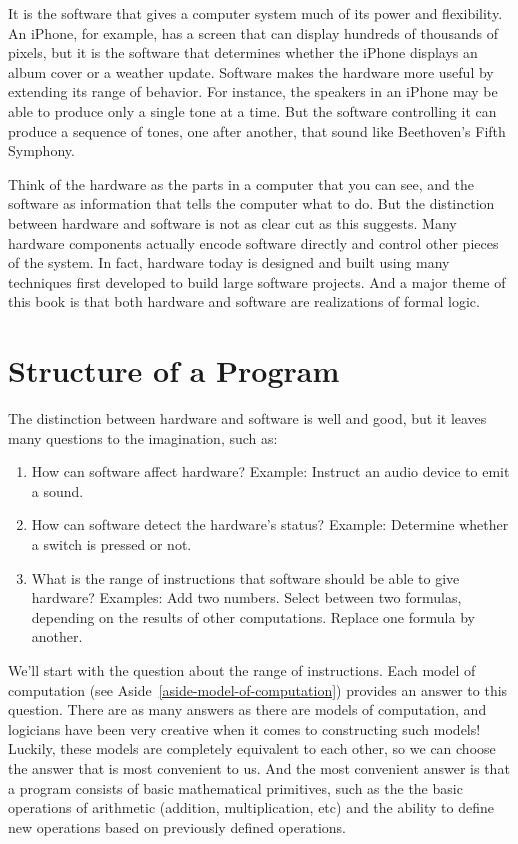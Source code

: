 It is the software that gives a computer system much of its power and
flexibility. An iPhone, for example, has a screen that
can display hundreds of thousands of pixels,
but it is the software that determines whether the
iPhone displays an album cover or a weather update.
Software makes the hardware more useful by extending its range of
behavior. For instance, the speakers in an iPhone may be able to produce
only a single tone at a time. But the software controlling it
can produce a sequence of tones, one after another,
that sound like Beethoven's Fifth Symphony.

Think of the hardware as
the parts in a computer that you can see, and the software
as information that tells the computer what to do.
But the distinction between hardware and software is not as
clear cut as this suggests. Many hardware components actually
encode software directly and control other pieces of the system.
In fact, hardware today is designed and built using many techniques
first developed to build large software projects.  And a major theme
of this book is that both hardware and software are realizations of formal
logic.

\section{Structure of a Program}

The distinction between hardware and software is well and good,
but it leaves many questions to the imagination, such as:
\begin{enumerate}
\item How can software affect hardware? Example: Instruct an audio
        device to emit a sound.
\item How can software detect the hardware's status? Example:
        Determine whether a switch is pressed or not.
\item What is the range of instructions that software should be able to give hardware?
        Examples: Add two numbers. Select between two formulas, depending on the results of other computations. Replace one formula by another.
\end{enumerate}

We'll start with the question about the range of instructions.
Each model of computation (see Aside~\ref{aside-model-of-computation})
provides an answer to this question.
There are as many answers as there are
models of computation, and logicians have been very creative when it
comes to constructing such models!  Luckily, these models are
completely equivalent to each other, so we can choose the answer
that is most convenient to us.  And the most convenient answer is
that a program consists of basic mathematical primitives, such as
the the basic operations of arithmetic (addition, multiplication, etc)
and the ability to define new operations
based on previously defined operations.

